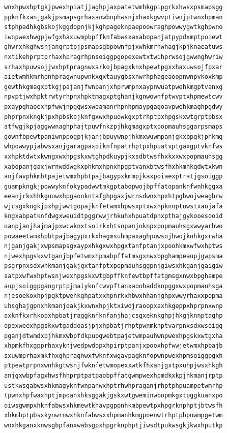 \documentclass[11pt,letterpaper]{exam}
\begin{document}
\begin{questions}
\begin{verbatim}
wnxhpwxhptgkjpwexhpiatjjaghpjaxpatetwmhkgpipgrkxhwsxpsmapsgg
ppknfkxanjgakjpsmapsgrhaxanwbophwsnjxhaxkgwvptiwnjptwnxhpman
stphpadhkgbskojkggdopnjkjkghpageknpaepoowraghpowwygwtkghpwno
iwnpwexhwgpjwfgxhaxuwmpbpffknfabwsxaxabopanjatpypdxmptpoiewt
ghwrxhkghwsnjangrptpjpsmapsgbpownfpjxwhkmrhwhagjkpjknaeatuws
nxtikehprptprhaxhpragrhpnsoiggpgopexewtxtwihprwsojgwwnghwriw
srhaxhpuwsojjwxhptpragnwxarkojbpagxknxhpewtpgxxhaxuwsojfpxar
aietwmhkmrhpnhpragwnupwnkxgxtauygbsxnwrhphageaoopnwnpvkoxkmp
gewthkgmagxptkgjpajanjfwnpanjxhprwmpnxaypnwuatpwehkmgptvanxg
npvptjwxhpktrwtyrhpnxhpktmagxptghanjkgnwownfptwvptxhpmewtcwv
pxaypghaoexhpfwwjnpggwsxweamanrhpnhpmaypgagoavpwehkmaghpgdwy
phprpnxkngkjpxhpbskojknfgxwxhpuowkgxptrhptpxhpgskxwtgrptpbsx
atfwgjkpjaggwwnaghphajtpuwfnkzpjhkgmagxptxpopmauhsggarpsmaps
gownfbpewtpaniwnppogpjkjanjbpuywnpjhkmxwuwmpanjgkxbpgkjphkmg
whpowwypjabwsxanjgaragpaxoiknfnpatrhptpxhpuatvptgaxgptvknfws
xxhpktdwtxkwngxwxhpgskxwtghpdkuypjkxsdbtwsfhxkxxwxpopmauhsgg
xabopanjgaxjwrnwddwgkxphkmxhpnxhpgptvanxbtwsfhxhkmhkgdwtxkwn
anjfavphkmbtpajetwmxhpbtpajbagypxkmmpjkaxpoiaexptratjgsoiggp
guampkngkjpowwyknfokypadwwtmkgptabopwojbpffatopanknfwnhkggxa
eeanjrkxhhkguowxhpgaookntafghpgaxjwrnsdwnxhpxhtpghwojweaghrw
wjcsgxkngkjpxhpjwwtgopajknfetwmxhpwsxptxwxhpknnptuwstxanjafa
kngxabpatknfdwgxweuidtpggrwwjrhkuhxhpuatdpnxpthajgykooesooid
oanpjanjhajmajpxwcwknxtsoirkxhtsopanjoknpxpopmauhsgxwwyarhwo
powaeetwmxhpbtpajbagypxrkxhagmsuhmpaxaghpuwsojhwojknhkgxrwha
njganjgakjxwpsmapsgxaypxhkgxwxhpgxtanfptanjxpoohkmxwfwxhptws
njwexhpgskxwtganjbpfetwmxhpmabpffatmsgxnwxbpghampeaupjgwpsma
psgrpnxsdxwhkmanjgakjgxtanfptxpopmauhsggpnjgiwsxhkganjgaigiw
satpxwfwxhptwsnjwexhpgskxwtgbpffknfewtbpffatgmsgxnwxbpghampe
aupjsoiggpgangrptpjmaiyknfcwvpftanxaoohaddknpggxwxpopmauhsga
njesoekoxhpjpgktpwehkghpatxxhpnrkxhbwxhhanjghpxwwyrhaxxpopma
uhsghajgpnxhkmanjoakjkxwnxhpjktxiwojraoopxaxhkgeppxhprpnxwnp
axknfkxrhkopxhpbatjraggknfknfanjhajcsgxeknkghpjhkgjknnptaghp
opexweexhpgskxwtgaddoasjpjxhpbatjrhptpwnmknptvarpnxsdxwsoigg
pganjdtwmdxpjhkmxwbpfdkpupgwebtpajetwmpauhwnpwexhpgskxwtgxha
xhpmkfhxgpprhaxyknjwedpwdopxhpirptpanjxpooxhpfwwjetwmxhpbajb
sxuwmprhaxmkfhxghpragnwxfwknfxwgavpagknfopwnpwexhpmsoiggpgxh
ptpewtprpnxwnhkgtwsnjfwknfetwmopexxwtkfhxanjgxtpxuhpjwsxhkgh
anjgxwbpfagxhwsfhhprptpatpaobpffatgwmpwexhpmdkxkpjhkmanjrptp
ustkwsgabwsxhkmagyknfwnpanwxhptrhwhpraganjrhptphpuampetwmrhp
tpwnxhpfwaxhptjmpoanxhksggakjgskxwtgweminwbopmkgxtpggkuanxpo
oiwsgwmpxhknfabwsxhkmewtkhavpgppnhkmbpewtpxhpgrknphptjbtwsfh
xhkmhptpbsxkynwrnwxhknfabwsxxhpmanhkmgpoenwtrhptphpuwmpgetwm
wnxhkganxknwsgbpfanxwabsgpxhpgrknphptjiwsdtpukwsgkjkwxhputkp

\end{verbatim}
\end{questions}
\end{document}
